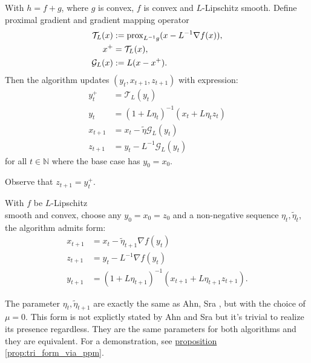         \begin{definition}
        \label{def:ag_prox_grad_generic}
            With $h = f + g$, where $g$ is convex, $f$ is convex and $L$-Lipschitz smooth. 
            Define proximal gradient and gradient mapping operator 
            $$
            \begin{aligned}
                \mathcal T_L(x) 
                &:= \operatorname{prox}_{L^{-1}g}(x - L^{-1}\nabla f(x)), 
                \\
                x^+ &= \mathcal T_L(x), 
                \\
                \mathcal G_L(x) 
                &:= L(x -  x^+). 
            \end{aligned}
            $$
            Then the algorithm updates $(y_t, x_{t + 1}, z_{t + 1})$ with expression: 
            $$
            \begin{aligned}
                y_t^+ &= \mathcal T_L(y_t)
                \\
                y_t &= (1 + L\eta_t)^{-1}(x_t + L\eta_t z_t)
                \\
                x_{t + 1} &= x_t - \tilde \eta \mathcal G_L(y_t)
                \\
                z_{t + 1} &= y_t - L^{-1}\mathcal G_L(y_t)
            \end{aligned}
            $$
            for all $t\in \mathbb N$ where the base case has $y_0 = x_0$. 
        \end{definition}
        \begin{remark}
            Observe that $z_{t + 1} = y_t^+$. 
        \end{remark}

        \begin{definition}\label{def:agg_tri}
            With $f$ be $L$-Lipschitz \\ 
            smooth and convex, choose any $y_0 = x_0=z_0$ and a non-negative sequence $\eta_t, \tilde\eta_t$, the algorithm admits form: 
            \begin{align*}
                x_{t + 1} &= x_t - \tilde \eta_{t + 1} \nabla f(y_t) 
                \\
                z_{t + 1} &= y_t - L^{-1} \nabla f(y_t) 
                \\
                y_{t + 1} &= 
                (1 + L\eta_{t + 1})^{-1}
                (
                x_{t + 1} + L\eta_{t + 1}z_{t + 1}
                ). 
            \end{align*}
        \end{definition}
        \begin{remark}
            The parameter $\eta_t, \tilde\eta_{t + 1}$ are exactly the same as Ahn, Sra \cite[(6.24)]{ahn_understanding_2022}, but with the choice of $\mu = 0$. 
            This form is not explictly stated by Ahn and Sra but it's trivial to realize its presence regardless. 
            They are the same parameters for both algorithms and they are equivalent. 
            For a demonstration, see 
            \hyperref[prop:tri_form_via_ppm]{proposition \ref*{prop:tri_form_via_ppm}}. 
        \end{remark}

